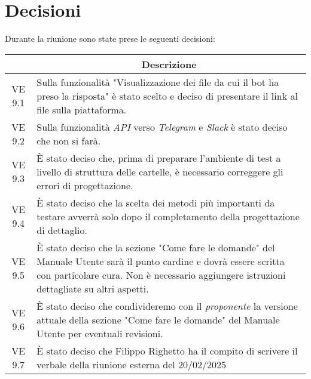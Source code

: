 

\section{Decisioni}

Durante la riunione sono state prese le seguenti decisioni:

\vspace{0.5cm}

\begin{table}[htbp]
    \centering
    \begin{tabular}{|c|p{}|}
        \hline
        \rowcolor[gray]{0.75}
        \multicolumn{1}{|c|}{\textbf{Codice}} & \multicolumn{1}{|c|}{\textbf{Descrizione}}\\
        \hline
        VE 9.1 & Sulla funzionalità "Visualizzazione dei file da cui il bot ha preso la risposta" è stato scelto e deciso di presentare il link al file sulla piattaforma.\\
        \hline
        VE 9.2 & Sulla funzionalità \emph{API} verso \emph{Telegram} e \emph{Slack} è stato deciso che non si farà.\\
        \hline
        VE 9.3 & È stato deciso che, prima di preparare l'ambiente di test a livello di struttura delle cartelle, è necessario correggere gli errori di progettazione.\\ 
        \hline
        VE 9.4 & È stato deciso che la scelta dei metodi più importanti da testare avverrà solo dopo il completamento della progettazione di dettaglio.\\
        \hline
        VE 9.5 & È stato deciso che la sezione "Come fare le domande" del Manuale Utente sarà il punto cardine e dovrà essere scritta con particolare cura. Non è necessario aggiungere istruzioni dettagliate su altri aspetti.\\
        \hline
        VE 9.6 & È stato deciso che condivideremo con il \emph{proponente} la versione attuale della sezione "Come fare le domande" del Manuale Utente per eventuali revisioni.\\
        \hline
        VE 9.7 & È stato deciso che Filippo Righetto ha il compito di scrivere il verbale della riunione esterna del 20/02/2025\\
        \hline
    \end{tabular}
\end{table}
